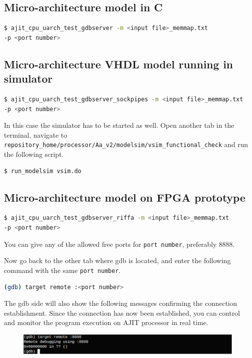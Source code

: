\documentclass[a4paper, 11pt]{article}
\begin{document}
\subsection*{Micro-architecture model in C}
\begin{lstlisting}[language=bash]
$ ajit_cpu_uarch_test_gdbserver -m <input file>_memmap.txt
-p <port number>
\end{lstlisting}

\subsection*{Micro-architecture VHDL model running in simulator}
\begin{lstlisting}[language=bash]
$ ajit_cpu_uarch_test_gdbserver_sockpipes -m <input file>_memmap.txt
-p <port number>
\end{lstlisting}
In this case the simulator has to be started as well. Open another tab in the terminal, navigate to\\ \texttt{repository\_home/processor/Aa\_v2/modelsim/vsim\_functional\_check} and run the following script.
\begin{lstlisting}[language=bash]
$ run_modelsim vsim.do
\end{lstlisting}

\subsection*{Micro-architecture model on FPGA prototype}
\begin{lstlisting}[language=bash]
$ ajit_cpu_uarch_test_gdbserver_riffa -m <input file>_memmap.txt
-p <port number>
\end{lstlisting}

\vspace*{1cm}
You can give any of the allowed free ports for \texttt{port number}, preferably 8888.

Now go back to the other tab where gdb is located, and enter the following command with
the same \texttt{port number}.
\begin{lstlisting}[language=bash]
(gdb) target remote :<port number>
\end{lstlisting}

The gdb side will also show the following messages confirming the connection establishment. Since the connection has now been established, you can control and monitor the program execution on AJIT processor in real time.
\begin{figure}[H]
	\centering
	\includegraphics[width=0.8\columnwidth]{Figs/second.png}
\end{figure}
\end{document}
